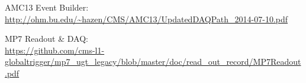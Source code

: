 \documentclass[11pt,a4paper,english,titlepage]{article}
\begin{document}
    \doctitlepage{}

    \doctoc{}

    

% 

    \clearpage

    \begin{thebibliography}{00}

    AMC13 Event Builder:\\
    \url{http://ohm.bu.edu/~hazen/CMS/AMC13/UpdatedDAQPath_2014-07-10.pdf}

    MP7 Readout \& DAQ:\\
    \url{https://github.com/cms-l1-globaltrigger/mp7_ugt_legacy/blob/master/doc/read_out_record/MP7Readout.pdf}

    \end{thebibliography}

\end{document}
